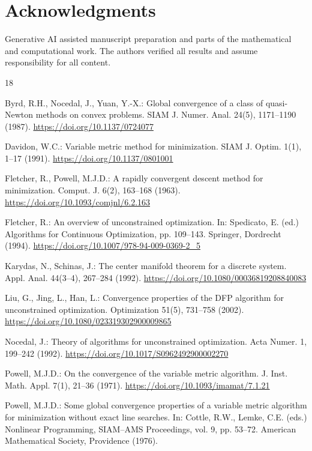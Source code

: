 \documentclass[11pt]{article}
\begin{document}
\section*{Acknowledgments}

Generative AI assisted manuscript preparation and parts of the mathematical
and computational work. The authors verified all results and assume
responsibility for all content.

\begin{thebibliography}{18}

Byrd, R.H., Nocedal, J., Yuan, Y.-X.:
Global convergence of a class of quasi-Newton methods on convex problems.
SIAM J. Numer. Anal. 24(5), 1171--1190 (1987).
\url{https://doi.org/10.1137/0724077}

Davidon, W.C.:
Variable metric method for minimization.
SIAM J. Optim. 1(1), 1--17 (1991).
\url{https://doi.org/10.1137/0801001}

Fletcher, R., Powell, M.J.D.:
A rapidly convergent descent method for minimization.
Comput. J. 6(2), 163--168 (1963).
\url{https://doi.org/10.1093/comjnl/6.2.163}

Fletcher, R.:
An overview of unconstrained optimization.
In: Spedicato, E. (ed.) Algorithms for Continuous Optimization,
pp. 109--143.
Springer, Dordrecht (1994).
\url{https://doi.org/10.1007/978-94-009-0369-2_5}

Karydas, N., Schinas, J.:
The center manifold theorem for a discrete system.
Appl. Anal. 44(3--4), 267--284 (1992).
\url{https://doi.org/10.1080/00036819208840083}

Liu, G., Jing, L., Han, L.:
Convergence properties of the DFP algorithm for unconstrained optimization.
Optimization 51(5), 731--758 (2002).
\url{https://doi.org/10.1080/023319302900009865}

Nocedal, J.:
Theory of algorithms for unconstrained optimization.
Acta Numer. 1, 199--242 (1992).
\url{https://doi.org/10.1017/S0962492900002270}

Powell, M.J.D.:
On the convergence of the variable metric algorithm.
J. Inst. Math. Appl. 7(1), 21--36 (1971).
\url{https://doi.org/10.1093/imamat/7.1.21}

Powell, M.J.D.:
Some global convergence properties of a variable metric algorithm for
minimization without exact line searches.
In: Cottle, R.W., Lemke, C.E. (eds.) Nonlinear Programming,
SIAM--AMS Proceedings, vol. 9, pp. 53--72.
American Mathematical Society, Providence (1976).


\end{thebibliography}
\end{document}

